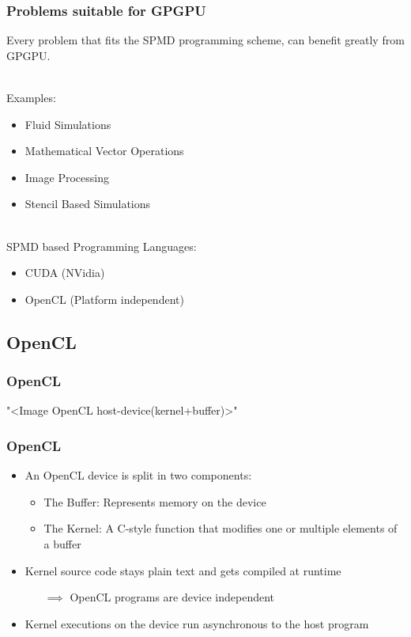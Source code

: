 \documentclass{beamer}
\begin{document}
\begin{frame}
    \frametitle{Problems suitable for GPGPU}
    Every problem that fits the \alert{SPMD} programming scheme, can benefit greatly
    from GPGPU.
    
    ~\\ 
    Examples:
    \begin{itemize}
        \item Fluid Simulations
        \item Mathematical Vector Operations
        \item Image Processing
        \item Stencil Based Simulations 
    \end{itemize}
    
    ~\\
    SPMD based Programming Languages:
    \begin{itemize}
        \item CUDA (NVidia)
        \item OpenCL (Platform independent)
    \end{itemize}
\end{frame}

\subsection{OpenCL}
\begin{frame}
    \frametitle{OpenCL}
    "<Image OpenCL host-device(kernel+buffer)>" 
\end{frame}
\begin{frame}
    \frametitle{OpenCL}
    \begin{itemize}
        \item An OpenCL device is split in two components:
        \begin{itemize}
            \item The \alert{Buffer}: Represents memory on the device
            \item The \alert{Kernel}: A C-style function that modifies one or multiple
                                      elements of a buffer
        \end{itemize}
        \item Kernel source code stays plain text and gets compiled at \alert{runtime}
        \begin{itemize}
            \item[$\implies$] OpenCL programs are device independent
        \end{itemize}
        \item Kernel executions on the device run asynchronous to the host program
    \end{itemize}
\end{frame}
\end{document}
